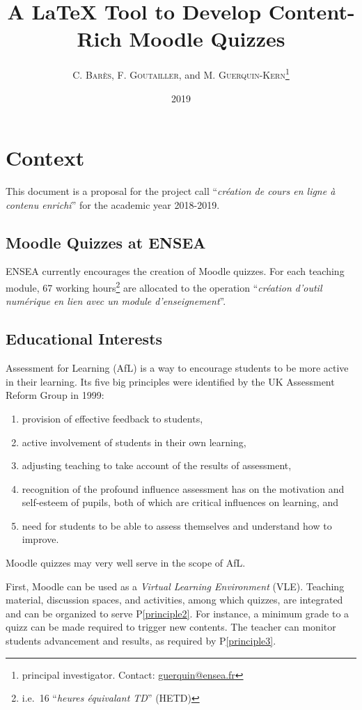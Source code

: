 \documentclass[twocolumn,a4paper,9pt]{article}
\title{A \LaTeX{} Tool to Develop Content-Rich Moodle Quizzes}
\author{C. \textsc{Barès}, F. \textsc{Goutailler}, and M. 
\textsc{Guerquin-Kern}\footnote{principal investigator. Contact: 
\href{mailto:guerquin@ensea.fr}{guerquin@ensea.fr}}}
\date{2019}
\begin{document}
\maketitle
\tableofcontents

\section{Context}

This document is a proposal for the project call ``\emph{création de cours en 
ligne à contenu enrichi}'' for the academic year 2018-2019.

\subsection{Moodle Quizzes at ENSEA}

ENSEA currently encourages the creation of Moodle quizzes. For each teaching 
module, 67 working hours\footnote{i.e.~16 ``\emph{heures équivalant TD}'' 
(HETD)} are allocated to the operation 
``\emph{création d’outil numérique en lien avec un module d’enseignement}''.

\subsection{Educational Interests}

Assessment for Learning (AfL) is a way to encourage students to be more active 
in their learning. Its five big principles were identified by the UK Assessment 
Reform Group in 1999:
\begin{enumerate}[P1]
	\item\label{principle1} provision of effective feedback to students,
	\item\label{principle2} active involvement of students in their own 
	learning,
	\item\label{principle3} adjusting teaching to take account of the results 
	of assessment,
	\item\label{principle4} recognition of the profound influence assessment 
	has on the 
	motivation and self-esteem of pupils, both of which are critical influences 
	on learning, and
	\item\label{principle5} need for students to be able to assess themselves 
	and understand how 
	to improve.
\end{enumerate}

Moodle quizzes may very well serve in the scope of AfL.

First, Moodle can be used as a \emph{Virtual Learning Environment} (VLE). 
Teaching material, discussion spaces, and activities, among which quizzes, are 
integrated and can be organized to serve P\ref{principle2}. For instance, a 
minimum grade to a quizz can be made required to trigger new contents. The 
teacher can monitor students advancement and results, as required by 
P\ref{principle3}.
\end{document}
